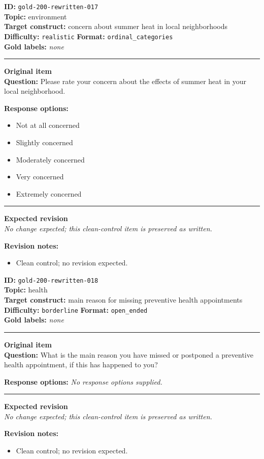 \documentclass[10pt,a4paper]{article}
\newcommand{\sectionline}{\vspace{0.15em}\hrule\vspace{0.35em}}
\begin{document}
\begin{tcolorbox}[colframe=CleanGreen,colback=white,colbacktitle=CleanGreen!9,coltitle=black,title={Item 017\hfill Clean control}]
\textbf{ID:} \texttt{gold-200-rewritten-017}\\
\textbf{Topic:} environment\\
\textbf{Target construct:} concern about summer heat in local neighborhoods\\
\textbf{Difficulty:} \texttt{realistic} \quad \textbf{Format:} \texttt{ordinal\_categories}\\
\textbf{Gold labels:} \textit{none}\\
\sectionline
\textbf{Original item}\\
\textbf{Question:} Please rate your concern about the effects of summer heat in your local neighborhood.
\par\textbf{Response options:}
\begin{itemize}
\item Not at all concerned
\item Slightly concerned
\item Moderately concerned
\item Very concerned
\item Extremely concerned
\end{itemize}
\sectionline
\textbf{Expected revision}\\
\textit{No change expected; this clean-control item is preserved as written.}
\par\textbf{Revision notes:}
\begin{itemize}
\item Clean control; no revision expected.
\end{itemize}
\end{tcolorbox}
\begin{tcolorbox}[colframe=CleanGreen,colback=white,colbacktitle=CleanGreen!9,coltitle=black,title={Item 018\hfill Clean control}]
\textbf{ID:} \texttt{gold-200-rewritten-018}\\
\textbf{Topic:} health\\
\textbf{Target construct:} main reason for missing preventive health appointments\\
\textbf{Difficulty:} \texttt{borderline} \quad \textbf{Format:} \texttt{open\_ended}\\
\textbf{Gold labels:} \textit{none}\\
\sectionline
\textbf{Original item}\\
\textbf{Question:} What is the main reason you have missed or postponed a preventive health appointment, if this has happened to you?
\par\textbf{Response options:}
\textit{No response options supplied.}
\sectionline
\textbf{Expected revision}\\
\textit{No change expected; this clean-control item is preserved as written.}
\par\textbf{Revision notes:}
\begin{itemize}
\item Clean control; no revision expected.
\end{itemize}
\end{tcolorbox}
\end{document}
